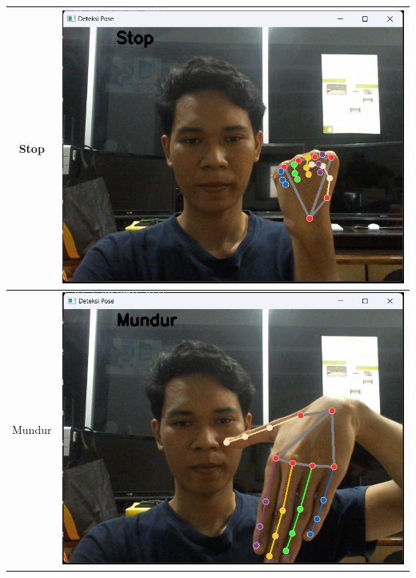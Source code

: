\begin{table}[H]
\begin{tabular}{|c|c|}
        Stop                & \includegraphics[scale=0.33]{gambar/bab3/Stop.png}   \\ \hline
        Mundur              & \includegraphics[scale=0.33]{gambar/bab3/Mundur.png} \\ \hline

\end{tabular}
\end{table}
